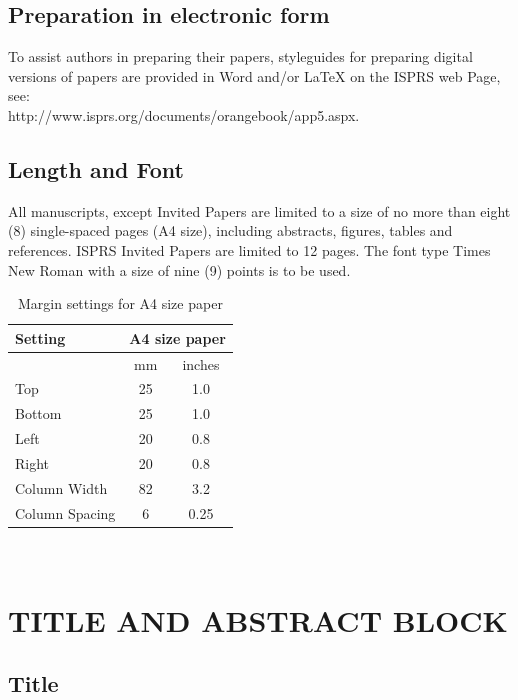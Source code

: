 \documentclass{isprs}
\begin{document}
\subsection{Preparation in electronic form}\label{sec:Preparation in electronic form}

To assist authors in preparing their papers, styleguides for preparing digital versions of papers are 
provided in Word and/or LaTeX on the ISPRS web Page, see:\\ http://www.isprs.org/documents/orangebook/app5.aspx.



\subsection{Length and Font}\label{sec:Length and Font}

All manuscripts, except Invited Papers are limited to a size of no more than eight (8) single-spaced 
pages (A4 size), including abstracts, figures, tables and references. ISPRS Invited Papers are limited 
to 12 pages. The font type Times New Roman with a size of nine (9) points is to be used.

\begin{table}[h]
	\centering
		\begin{tabular}{|l|c|c|}\hline
			Setting&\multicolumn{2}{c|}{A4 size paper}\\\hline
			  &mm&inches\\
			 Top&25&1.0\\
			 Bottom&25&1.0\\
			 Left&20&0.8\\
			 Right&20&0.8\\
			 Column Width&82&3.2\\
			 Column Spacing&6&0.25\\\hline
		\end{tabular}
	\caption{Margin settings for A4 size paper}
	\label{tab:Margin_settings}
\end{table}

~ %

\section{TITLE AND ABSTRACT BLOCK}\label{sec:TITLE AND ABSTRACT BLOCK}

\subsection{Title}\label{sec:Title}
\end{document}
